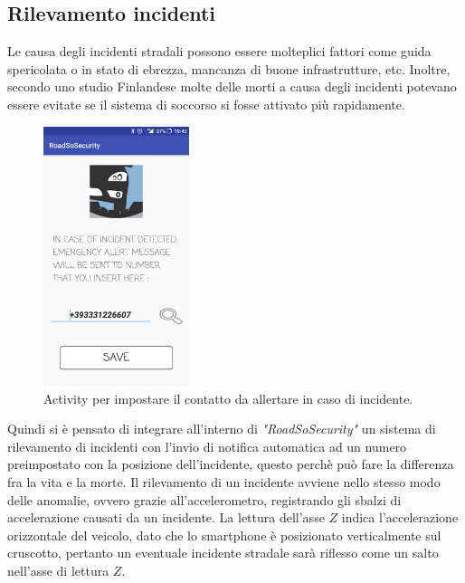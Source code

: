 \documentclass[a4paper, 11pt]{article} %
\begin{document}
\subsection*{Rilevamento incidenti \cite{Faiz2016}}
Le causa degli incidenti stradali possono essere molteplici fattori come guida spericolata o in stato di ebrezza, mancanza di buone infrastrutture, etc. Inoltre, secondo uno studio Finlandese molte delle morti a causa degli incidenti potevano essere evitate se il sistema di soccorso si fosse attivato più rapidamente.
\begin{figure} %
	\begin{center}
		\includegraphics[width=0.38\textwidth]{images/numberActivity.jpg}
	\end{center}
	\caption{Activity per impostare il contatto da allertare in caso di incidente.}
	\label{fig:numberAnomaly}
\end{figure}
Quindi si è pensato di integrare all'interno di \textit{"RoadSoSecurity"} un sistema di rilevamento di incidenti con l'invio di notifica automatica ad un numero preimpostato con la posizione dell’incidente, questo perchè può fare la differenza fra la vita e la morte. Il rilevamento di un incidente avviene nello stesso modo delle anomalie, ovvero grazie all'accelerometro, registrando gli sbalzi di accelerazione causati da un incidente. La lettura dell'asse $Z$ indica l'accelerazione orizzontale del veicolo, dato che lo smartphone è posizionato verticalmente sul cruscotto, pertanto un eventuale incidente stradale sarà riflesso come un salto nell'asse di lettura $Z$. 
\end{document}
